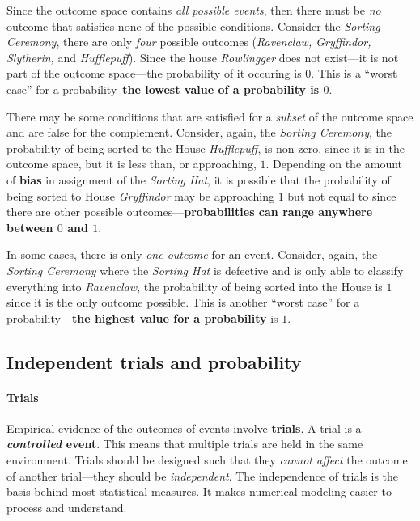 Since the outcome space contains \emph{all possible events}, then there must be \emph{no} outcome that satisfies none of the possible conditions.
Consider the \textit{Sorting Ceremony}, there are only \emph{four} possible outcomes (\textit{Ravenclaw, Gryffindor, Slytherin,} and \textit{Hufflepuff}).
Since the house \textit{Rowlingger} does not exist---it is not part of the outcome space---the probability of it occuring is $0$.
This is a ``worst case'' for a probability--\textbf{the lowest value of a probability is $0$}.

There may be some conditions that are satisfied for a \emph{subset} of the outcome space and are false for the complement.
Consider, again, the \textit{Sorting Ceremony}, the probability of being sorted to the House \textit{Hufflepuff}, is non-zero, since it is in the outcome space, but it is less than, or approaching, $1$.
Depending on the amount of \textbf{bias} in assignment of the \textit{Sorting Hat}, it is possible that the probability of being sorted to House \textit{Gryffindor} may be approaching $1$ but not equal to since there are other possible outcomes---\textbf{probabilities can range anywhere between $0$ and $1$}.

In some cases, there is only \emph{one outcome} for an event.
Consider, again, the \textit{Sorting Ceremony} where the \textit{Sorting Hat} is defective and is only able to classify everything into \textit{Ravenclaw}, the probability of being sorted into the House is $1$ since it is the only outcome possible.
This is another ``worst case'' for a probability---\textbf{the highest value for a probability} is $1$.

\subsection{Independent trials and probability}

\paragraph{Trials}
Empirical evidence of the outcomes of events involve \textbf{trials}.
A trial is a \textbf{\emph{controlled} event}.
This means that multiple trials are held in the same enviromnent.
Trials should be designed such that they \emph{cannot affect} the outcome of another trial---they should be \emph{independent}.
The independence of trials is the basis behind most statistical measures.
It makes numerical modeling easier to process and understand.

